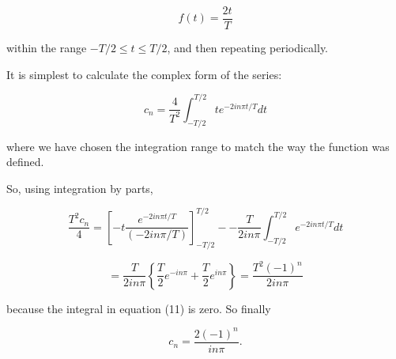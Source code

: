   \begin{equation*}f(t) = \dfrac{2t}{T} \tag{9}\end{equation*} 

  \noindent{}within the range $-T/2 \le t \le T/2$, and then repeating 
  periodically. 

  It is simplest to calculate the complex form of the series: 

  \begin{equation*}c_n=\dfrac{4}{T^2} \int_{-T/2}^{T/2}{t e^{-2in \pi t/T} dt} 
  \tag{10}\end{equation*} 

  \noindent{}where we have chosen the integration range to match the way the 
  function was defined. 

  So, using integration by parts, 

  \begin{equation*}\dfrac{T^2 c_n}{4} = \left[ -t \dfrac{e^{-2in \pi 
  t/T}}{(-2in \pi /T)} \right]_{-T/2}^{T/2} -- \dfrac{T}{2in \pi} 
  \int_{-T/2}^{T/2}{e^{-2in \pi t/T} dt} \tag{11}\end{equation*} 

  \begin{equation*}=\dfrac{T}{2in \pi} \left\lbrace \dfrac{T}{2} e^{-in \pi} + 
  \dfrac{T}{2} e^{in \pi} \right\rbrace = \dfrac{T^2 (-1)^n}{2in \pi} 
  \tag{12}\end{equation*} 

  \noindent{}because the integral in equation (11) is zero. So finally 

  \begin{equation*}c_n = \dfrac{2(-1)^n}{in \pi} . \tag{13}\end{equation*} 